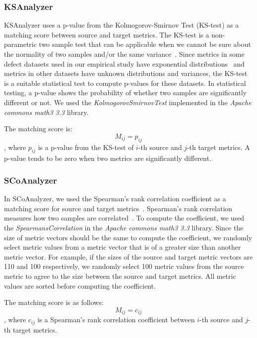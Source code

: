 \subsubsection{KSAnalyzer}
KSAnalyzer uses a p-value from the Kolmogorov-Smirnov Test (KS-test)
as a matching score between source and target metrics. The KS-test is a
non-parametric two sample test that can be applicable when we cannot be sure
about the normality of two samples and/or the same
variance~\cite{Lilliefors67,Massey51}. Since metrics in some defect datasets
used in our empirical study have exponential distributions~\cite{Menzies07} and
metrics in other datasets have unknown distributions and variances, the KS-test
is a suitable statistical test to compute p-values for these datasets. In statistical testing, a p-value shows the
probability of whether two samples are significantly different or not. We used
the {\em KolmogorovSmirnovTest} implemented in the {\em Apache commons math3 3.3}
library.


The matching score is:
\begin{equation}M_{ij}=p_{ij}\end{equation}
, where $p_{ij}$ is a p-value from the KS-test of $i$-th source and $j$-th
target metrics. A p-value tends to be zero when two metrics are significantly
different.

\subsubsection{SCoAnalyzer}
In SCoAnalyzer, we used the Spearman's
rank correlation coefficient as a matching score for source and target
metrics~\cite{Spearman10}.
Spearman's rank correlation measures how two samples
are correlated~\cite{Spearman10}. To compute the coefficient, we used the
{\em SpearmansCorrelation} in the {\em Apache commons math3 3.3} library. Since the
size of metric vectors should be the same to compute the coefficient, we
randomly select metric values from a metric vector that is of a greater size
than another metric vector. For example, if the sizes of the source and target metric
vectors are 110 and 100 respectively, we randomly select 100 metric values from the
source metric to agree to the size between the source and target metrics. All
metric values are sorted before computing the coefficient.

The matching score is as follows:
\begin{equation}M_{ij}=c_{ij}\end{equation}
, where $c_{ij}$ is a Spearman's rank correlation coefficient between $i$-th
source and $j$-th target metrics.

